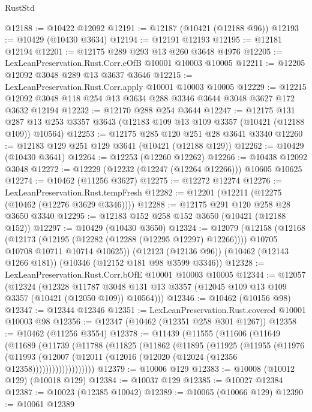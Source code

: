\begin{lexlean}{RustStd}
\begin{coremodule}
@12188 := @10422 @12092
@12191 := @12187 (@10421 (@12188 @96))
@12193 := @10429 (@10430 @3634)
@12194 := @12191 @12193
@12195 := @12181 @12194
@12201 := @12175 @289 @293 @13 @260 @3648 @4976
@12205 := LexLeanPreservation.Rust.Corr.eOfB @10001 @10003 @10005
@12211 := @12205 @12092 @3048 @289 @13 @3637 @3646
@12215 := LexLeanPreservation.Rust.Corr.apply @10001 @10003 @10005
@12229 := @12215 @12092 @3048 @118 @254 @13 @3634 @288 @3346 @3644 @3048 @3627 @172 @3632 @12194
@12232 := @12170 @288 @254 @3644
@12247 := @12175
    @131
    @287
    @13
    @253
    @3357
    @3643
    (@12183 @109 @13 @109 @3357 (@10421 (@12188 @109)) @10564)
@12253 := @12175 @285 @120 @251 @28 @3641 @3340
@12260 := @12183 @129 @251 @129 @3641 (@10421 (@12188 @129))
@12262 := @10429 (@10430 @3641)
@12264 := @12253 (@12260 @12262)
@12266 := @10438 @12092 @3048
@12272 := @12229 (@12232 (@12247 (@12264 @12266))) @10605 @10625
@12274 := @10462 (@11256 @3627)
@12275 := @12272 @12274
@12276 := LexLeanPreservation.Rust.tempFresh
@12282 := @12201 (@12211 (@12275 (@10462 (@12276 @3629 @3346))))
@12288 := @12175 @291 @120 @258 @28 @3650 @3340
@12295 := @12183 @152 @258 @152 @3650 (@10421 (@12188 @152))
@12297 := @10429 (@10430 @3650)
@12324 := @12079
    (@12158
      (@12168
        (@12173 (@12195 (@12282 (@12288 (@12295 @12297) @12266))))
        @10705
        @10708
        @10711
        @10714
        @10625))
    (@12123 (@12136 @96))
    (@10462 (@12143 @1266 @181))
    (@10346 (@12152 @181 @98 @3599 @3346))
@12328 := LexLeanPreservation.Rust.Corr.bOfE @10001 @10003 @10005
@12344 := @12057
    (@12324
      (@12328
        @11787
        @3048
        @131
        @13
        @3357
        (@12045 @109 @13 @109 @3357 (@10421 (@12050 @109)) @10564)))
@12346 := @10462 (@10156 @98)
@12347 := @12344 @12346
@12351 := LexLeanPreservation.Rust.covered @10001 @10003 @98
@12356 := @12347 (@10462 (@12351 @258 @301 @1267))
@12358 := @10462 (@11256 @3554)
@12378 := @11439
    (@11555
      (@11606
        (@11649
          (@11689
            (@11739
              (@11788
                (@11825
                  (@11862
                    (@11895
                      (@11925
                        (@11955
                          (@11976
                            (@11993
                              (@12007
                                (@12011 (@12016 (@12020 (@12024 (@12356 @12358)))))))))))))))))))
@12379 := @10006 @129
@12383 := @10008 (@10012 @129) (@10018 @129)
@12384 := @10037 @129
@12385 := @10027 @12384
@12387 := @10023 (@12385 @10042)
@12389 := @10065 (@10066 @129)
@12390 := @10061 @12389

\end{coremodule}
\end{lexlean}
